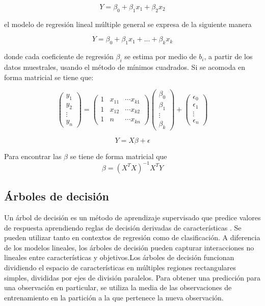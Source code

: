 \documentclass[conference]{IEEEtran}
\begin{document}
\begin{equation}
Y= \beta_0 + \beta_1x_1 + \beta_2x_2
\end{equation}

el modelo de regresión lineal múltiple general se expresa de la siguiente manera 


\begin{equation}
Y= \beta_0 + \beta_1x_1 + ... + \beta_kx_k
\end{equation}

donde cada coeficiente de regresión $\beta_i$ se estima por medio de $b_i$, a partir de los datos muestrales, usando el método de mínimos cuadrados. Si se acomoda en forma matricial se tiene que:

\begin{equation}
\begin{pmatrix}
y_1 \\
y_2 \\
\vdots \\
y_n 
\end{pmatrix}
=
\begin{pmatrix}
1 & x_{11} & \dotsi x_{k1}\\
1 & x_{12} & \dotsi x_{k2}\\
1 & n & \dotsi x_{kn}
\end{pmatrix}
\begin{pmatrix}
\beta_0 \\
\beta_1 \\
\vdots \\
\beta_k
\end{pmatrix}
+
\begin{pmatrix}
\epsilon_0 \\
\epsilon_1 \\
\vdots \\
\epsilon_n
\end{pmatrix}
\end{equation}

\begin{equation}
Y=X\beta+\epsilon
\end{equation}

Para encontrar las $\beta$ se tiene de forma matricial que
\begin{equation}
\beta=(X^TX)^{-1}X^TY
\end{equation}

\subsection{Árboles de decisión}
Un árbol de decisión es un método de aprendizaje supervisado que predice valores de respuesta aprendiendo reglas de decisión derivadas de características \cite{b3}. Se pueden utilizar tanto en contextos de regresión como de clasificación. A diferencia de los modelos lineales, los árboles de decisión pueden capturar interacciones no lineales entre características y objetivos.Los árboles de decisión funcionan dividiendo el espacio de características en múltiples regiones rectangulares simples, divididas por ejes de división paralelos. Para obtener una predicción para una observación en particular, se utiliza la media de las observaciones de entrenamiento en la partición a la que pertenece la nueva observación.
\end{document}
